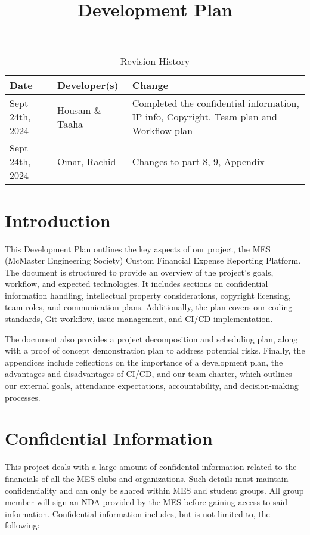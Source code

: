 \documentclass{article}
\title{Development Plan\\\progname}
\author{\authname}
\date{}
\begin{document}
\maketitle

\begin{table}[hp]
\caption{Revision History} \label{TblRevisionHistory}
\begin{tabularx}{\textwidth}{llX}
\toprule
\textbf{Date} & \textbf{Developer(s)} & \textbf{Change}\\
\midrule
Sept 24th, 2024 & Housam \& Taaha & Completed the confidential information, IP info, Copyright, Team plan and Workflow plan \\
Sept 24th, 2024 & Omar, Rachid & Changes to part 8, 9, Appendix\\
\bottomrule
\end{tabularx}
\end{table}

\newpage{}

\section*{Introduction}

This Development Plan outlines the key aspects of our project, the MES (McMaster Engineering Society) Custom Financial Expense Reporting Platform. The document is structured to provide an overview of the project's goals, workflow, and expected technologies. It includes sections on confidential information handling, intellectual property considerations, copyright licensing, team roles, and communication plans. Additionally, the plan covers our coding standards, Git workflow, issue management, and CI/CD implementation. 

The document also provides a project decomposition and scheduling plan, along with a proof of concept demonstration plan to address potential risks. Finally, the appendices include reflections on the importance of a development plan, the advantages and disadvantages of CI/CD, and our team charter, which outlines our external goals, attendance expectations, accountability, and decision-making processes.

\section{Confidential Information}
This project deals with a large amount of confidental information related to the financials of all the MES clubs and organizations. Such details must maintain confidentiality and can only be shared within MES and student groups. All group member will sign an NDA provided by the MES before gaining access to said information. Confidential information includes, but is not limited to, the following:
\end{document}
